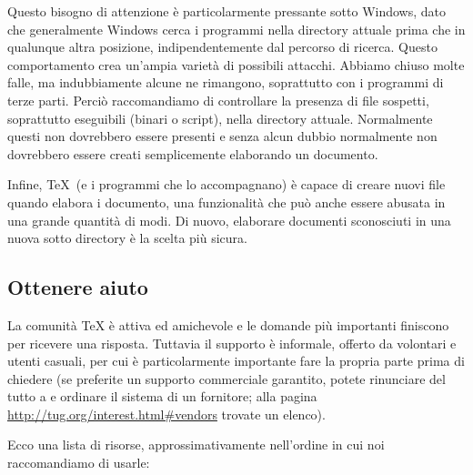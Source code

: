 \documentclass{article}
\begin{document}
Questo bisogno di attenzione è particolarmente pressante sotto Windows,
dato che generalmente Windows cerca i programmi nella directory attuale
prima che in qualunque altra posizione, indipendentemente dal percorso di
ricerca. Questo comportamento crea un'ampia varietà di possibili attacchi.
Abbiamo chiuso molte falle, ma indubbiamente alcune ne rimangono,
soprattutto con i programmi di terze parti. Perciò raccomandiamo di
controllare la presenza di file sospetti, soprattutto eseguibili 
(binari o script), nella directory attuale. Normalmente questi non
dovrebbero essere presenti e senza alcun dubbio normalmente non dovrebbero
essere creati semplicemente elaborando un documento.

Infine, \TeX\ (e i programmi che lo accompagnano) è capace di creare nuovi
file quando elabora i documento, una funzionalità che può anche essere
abusata in una grande quantità di modi. Di nuovo, elaborare documenti
sconosciuti in una nuova sotto directory è la scelta più sicura.


\subsection{Ottenere aiuto}
\label{sec:help}

La comunità \TeX{} è attiva ed amichevole e le domande più importanti
finiscono per ricevere una risposta. Tuttavia il supporto è informale,
offerto da volontari e utenti casuali, per cui è particolarmente
importante fare la propria parte prima di chiedere (se preferite un
supporto commerciale garantito, potete rinunciare del tutto a \TL{} e
ordinare il sistema di un fornitore; alla pagina
\url{http://tug.org/interest.html#vendors} trovate un elenco).

Ecco una lista di risorse, approssimativamente nell'ordine in cui noi
raccomandiamo di usarle:
\end{document}
